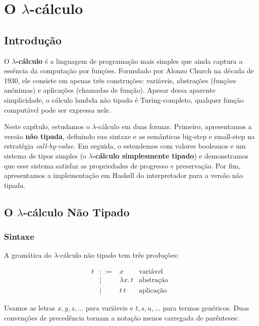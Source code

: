 \chapter{O $\lambda$-cálculo}

\section{Introdução}

O \textbf{$\lambda$-cálculo} é a linguagem de programação mais simples
que ainda captura a essência da computação por funções. Formulado por
Alonzo Church na década de 1930, ele consiste em apenas três
construções: variáveis, abstrações (funções anônimas) e aplicações
(chamadas de função). Apesar dessa aparente simplicidade, o cálculo
lambda não tipado é Turing-completo, qualquer função computável
pode ser expressa nele.

Neste capítulo, estudamos o $\lambda$-cálculo em duas formas. Primeiro,
apresentamos a versão \textbf{não tipada}, definindo sua sintaxe e as
semânticas big-step e small-step na estratégia \emph{call-by-value}.
Em seguida, o estendemos com valores booleanos e um sistema de tipos
simples (o \textbf{$\lambda$-cálculo simplesmente tipado}) e
demonstramos que esse sistema satisfaz as propriedades de progresso e
preservação. Por fim, apresentamos a implementação em Haskell do
interpretador para a versão não tipada.

\section{O $\lambda$-cálculo Não Tipado}

\subsection{Sintaxe}

A gramática do $\lambda$-cálculo não tipado tem três produções:

\[
  \begin{array}{rcll}
    t & ::= & x & \text{variável} \\
    & |   & \lambda x.\, t & \text{abstração} \\
    & |   & t\, t   & \text{aplicação}
\end{array} \]

Usamos as letras \(x, y, z, \ldots\) para variáveis e \(t, s, u,
\ldots\) para termos genéricos. Duas convenções de precedência tornam
a notação menos carregada de parênteses:

